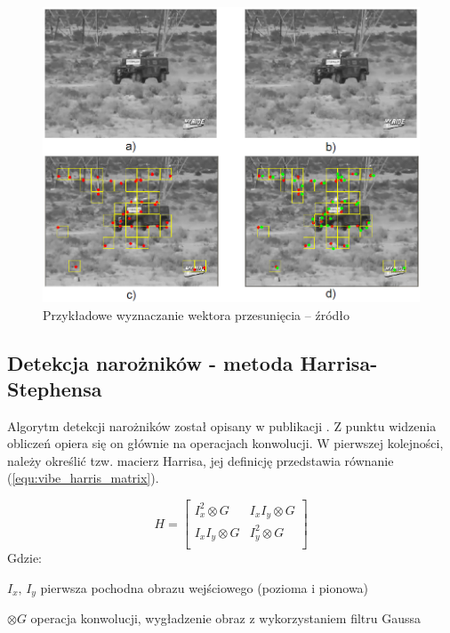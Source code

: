 	\begin{figure}[h]
		\centering
		\includegraphics[scale=0.65]{img/3/of_example.png}
		\caption{Przykładowe wyznaczanie wektora przesunięcia -- źródło \cite{kryjak_14_vibe}}
		\label{fig:vibe_of_example}
	\end{figure}

\subsection{Detekcja narożników - metoda Harrisa-Stephensa}
\label{subsec:vibe_harris}

Algorytm detekcji narożników został opisany w publikacji \cite{harris_88}. Z punktu widzenia obliczeń opiera się on głównie na operacjach konwolucji. W pierwszej kolejności, należy określić tzw. macierz Harrisa, jej definicję przedstawia równanie (\ref{equ:vibe_harris_matrix}).

    \begin{equation}
        H = \begin{bmatrix}
               I_x^2 \otimes G    & I_x I_y \otimes G  \\
               I_x I_y \otimes G  & I_y^2 \otimes G    \\
     \end{bmatrix}
        \label{equ:vibe_harris_matrix}
    \end{equation}
Gdzie:
\begin{eqwhere}[2cm]
	\item[$I_x,\, I_y$] pierwsza pochodna obrazu wejściowego (pozioma i pionowa)
	\item[$\otimes G$] operacja konwolucji, wygładzenie obraz z wykorzystaniem filtru Gaussa
\end{eqwhere}

